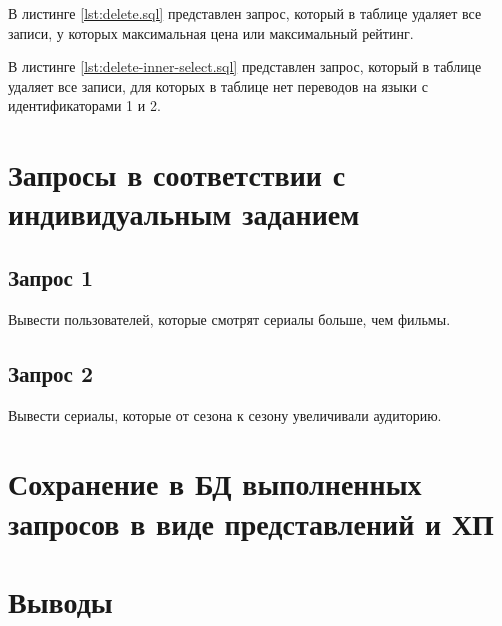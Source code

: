 В листинге \ref{lst:delete.sql} представлен запрос, который в таблице  удаляет все записи, у которых максимальная цена или максимальный рейтинг.



В листинге \ref{lst:delete-inner-select.sql} представлен запрос, который в таблице  удаляет все записи, для которых в таблице  нет переводов на языки с идентификаторами 1 и 2.



\section{Запросы в соответствии с индивидуальным заданием}

\subsection{Запрос 1}

Вывести пользователей, которые смотрят сериалы больше, чем фильмы.

\subsection{Запрос 2}

Вывести сериалы, которые от сезона к сезону увеличивали аудиторию.

\section{Сохранение в БД выполненных запросов в виде представлений и ХП}


\section{Выводы}



